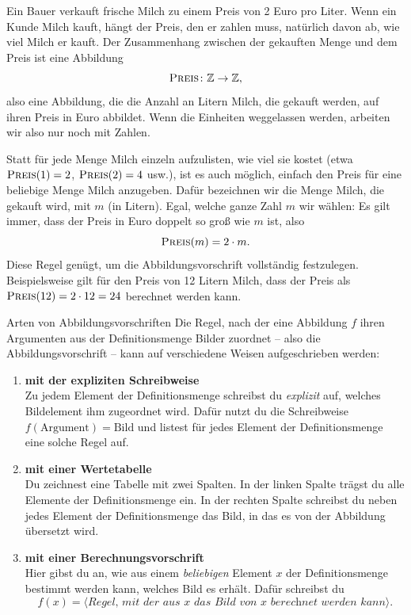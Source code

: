 \documentclass[../../main.tex]{subfiles}
\begin{document}
\begin{example}{}
    Ein Bauer verkauft frische Milch zu einem Preis von 2 Euro pro Liter. Wenn ein Kunde Milch kauft, hängt der Preis, den er zahlen muss, natürlich davon ab, wie viel Milch er kauft. Der Zusammenhang zwischen der gekauften Menge und dem Preis ist eine Abbildung \[\textsc{Preis}\colon\mathbb{Z}\rightarrow\mathbb{Z},\] also eine Abbildung, die die Anzahl an Litern Milch, die gekauft werden, auf ihren Preis in Euro abbildet. Wenn die Einheiten weggelassen werden, arbeiten wir also nur noch mit Zahlen. 
    
    Statt für jede Menge Milch einzeln aufzulisten, wie viel sie kostet (etwa \mbox{$\textsc{Preis}(1)=2$}, $\textsc{Preis}(2)=4$ usw.), ist es auch möglich, einfach den Preis für eine beliebige Menge Milch anzugeben. Dafür bezeichnen wir die Menge Milch, die gekauft wird, mit $m$ (in Litern). Egal, welche ganze Zahl $m$ wir wählen: Es gilt immer, dass der Preis in Euro doppelt so groß wie $m$ ist, also \[\textsc{Preis}(m)=2\cdot m.\]
    Diese Regel genügt, um die Abbildungsvorschrift vollständig festzulegen. Beispielsweise gilt für den Preis von 12 Litern Milch, dass der Preis als \mbox{$\textsc{Preis}(12)=2\cdot 12=24$} berechnet werden kann.
\end{example}


\begin{nutshell}{Arten von Abbildungsvorschriften}
    Die Regel, nach der eine Abbildung $f$ ihren Argumenten aus der Definitionsmenge Bilder zuordnet -- also die Abbildungsvorschrift -- kann auf verschiedene Weisen aufgeschrieben werden:
    \begin{enumerate}[label=\textbf{(\arabic*)}]
        \item \textbf{mit der expliziten Schreibweise}\\
            \sloppy
            Zu jedem Element der Definitionsmenge schreibst du \emph{explizit} auf, welches Bildelement ihm zugeordnet wird. Dafür nutzt du die Schreibweise \mbox{$f(\text{Argument})=\text{Bild}$} und listest für jedes Element der Definitionsmenge eine solche Regel auf.
        
            \fussy
        \item \textbf{mit einer Wertetabelle}\\
            Du zeichnest eine Tabelle mit zwei Spalten. In der linken Spalte trägst du alle Elemente der Definitionsmenge ein. In der rechten Spalte schreibst du neben jedes Element der Definitionsmenge das Bild, in das es von der Abbildung übersetzt wird.
        
        \item \textbf{mit einer Berechnungsvorschrift}\\
            Hier gibst du an, wie aus einem \emph{beliebigen} Element $x$ der Definitionsmenge bestimmt werden kann, welches Bild es erhält. Dafür schreibst du
            \[f(x)=\langle\textit{Regel, mit der aus $x$ das Bild von $x$ berechnet werden kann}\rangle.\]
    \end{enumerate}
\end{nutshell}
\end{document}
